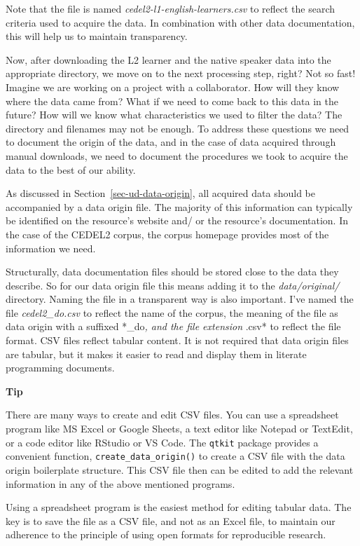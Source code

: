 \documentclass[
  letterpaper,
]{latex/krantz}
\theoremstyle{definition}
\theoremstyle{remark}
\begin{document}
Note that the file is named \emph{cedel2-l1-english-learners.csv} to
reflect the search criteria used to acquire the data. In combination
with other data documentation, this will help us to maintain
transparency.

Now, after downloading the L2 learner and the native speaker data into
the appropriate directory, we move on to the next processing step,
right? Not so fast! Imagine we are working on a project with a
collaborator. How will they know where the data came from? What if we
need to come back to this data in the future? How will we know what
characteristics we used to filter the data? The directory and filenames
may not be enough. To address these questions we need to document the
origin of the data, and in the case of data acquired through manual
downloads, we need to document the procedures we took to acquire the
data to the best of our ability.

As discussed in Section~\ref{sec-ud-data-origin}, all acquired data
should be accompanied by a data origin file. The majority of this
information can typically be identified on the resource's website and/
or the resource's documentation. In the case of the CEDEL2 corpus, the
corpus homepage provides most of the information we need.

Structurally, data documentation files should be stored close to the
data they describe. So for our data origin file this means adding it to
the \emph{data/original/} directory. Naming the file in a transparent
way is also important. I've named the file \emph{cedel2\_do.csv} to
reflect the name of the corpus, the meaning of the file as data origin
with a suffixed *\_do\emph{, and the file extension }.csv* to reflect
the file format. CSV files reflect tabular content. It is not required
that data origin files are tabular, but it makes it easier to read and
display them in literate programming documents.

\begin{tcolorbox}[enhanced jigsaw, colframe=quarto-callout-color-frame, breakable, bottomrule=.15mm, arc=.35mm, left=2mm, opacityback=0, rightrule=.15mm, colback=white, toprule=.15mm, leftrule=.75mm]

\textbf{ Tip}

There are many ways to create and edit CSV files. You can use a
spreadsheet program like MS Excel or Google Sheets, a text editor like
Notepad or TextEdit, or a code editor like RStudio or VS Code. The
\texttt{qtkit} package provides a convenient function,
\texttt{create\_data\_origin()} to create a CSV file with the data
origin boilerplate structure. This CSV file then can be edited to add
the relevant information in any of the above mentioned programs.

Using a spreadsheet program is the easiest method for editing tabular
data. The key is to save the file as a CSV file, and not as an Excel
file, to maintain our adherence to the principle of using open formats
for reproducible research.

\end{tcolorbox}
\end{document}
